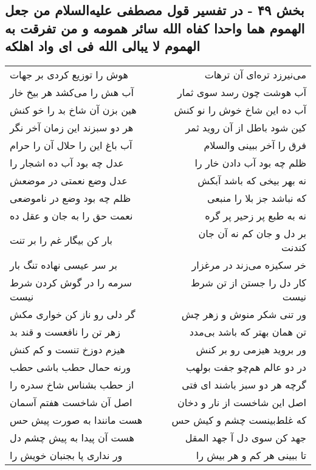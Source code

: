 \begin{center}
\section*{بخش ۴۹ - در تفسیر قول مصطفی علیه‌السلام من جعل الهموم هما واحدا کفاه الله سائر همومه و من تفرقت به الهموم لا یبالی الله فی ای واد اهلکه}
\label{sec:sh049}
\begin{longtable}{l p{0.5cm} r}
هوش را توزیع کردی بر جهات
&&
می‌نیرزد تره‌ای آن ترهات
\\
آب هش را می‌کشد هر بیخ خار
&&
آب هوشت چون رسد سوی ثمار
\\
هین بزن آن شاخ بد را خو کنش
&&
آب ده این شاخ خوش را نو کنش
\\
هر دو سبزند این زمان آخر نگر
&&
کین شود باطل از آن روید ثمر
\\
آب باغ این را حلال آن را حرام
&&
فرق را آخر ببینی والسلام
\\
عدل چه بود آب ده اشجار را
&&
ظلم چه بود آب دادن خار را
\\
عدل وضع نعمتی در موضعش
&&
نه بهر بیخی که باشد آبکش
\\
ظلم چه بود وضع در ناموضعی
&&
که نباشد جز بلا را منبعی
\\
نعمت حق را به جان و عقل ده
&&
نه به طبع پر زحیر پر گره
\\
بار کن بیگار غم را بر تنت
&&
بر دل و جان کم نه آن جان کندنت
\\
بر سر عیسی نهاده تنگ بار
&&
خر سکیزه می‌زند در مرغزار
\\
سرمه را در گوش کردن شرط نیست
&&
کار دل را جستن از تن شرط نیست
\\
گر دلی رو ناز کن خواری مکش
&&
ور تنی شکر منوش و زهر چش
\\
زهر تن را نافعست و قند بد
&&
تن همان بهتر که باشد بی‌مدد
\\
هیزم دوزخ تنست و کم کنش
&&
ور بروید هیزمی رو بر کنش
\\
ورنه حمال حطب باشی حطب
&&
در دو عالم هم‌چو جفت بولهب
\\
از حطب بشناس شاخ سدره را
&&
گرچه هر دو سبز باشند ای فتی
\\
اصل آن شاخست هفتم آسمان
&&
اصل این شاخست از نار و دخان
\\
هست مانندا به صورت پیش حس
&&
که غلط‌بینست چشم و کیش حس
\\
هست آن پیدا به پیش چشم دل
&&
جهد کن سوی دل آ جهد المقل
\\
ور نداری پا بجنبان خویش را
&&
تا ببینی هر کم و هر بیش را
\\
\end{longtable}
\end{center}
